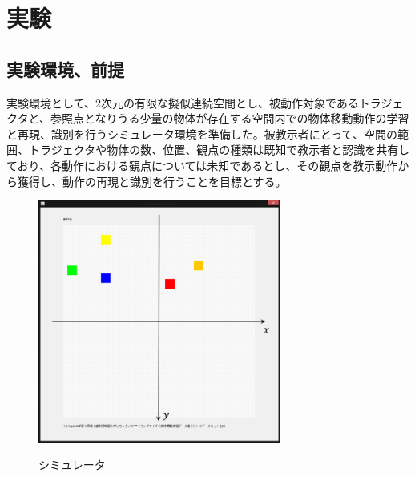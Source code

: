 ﻿%
\chapter{実験}

\section{実験環境、前提}

実験環境として、2次元の有限な擬似連続空間とし、被動作対象であるトラジェクタと、参照点となりうる少量の物体が存在する空間内での物体移動動作の学習と再現、識別を行うシミュレータ環境を準備した。被教示者にとって、空間の範囲、トラジェクタや物体の数、位置、観点の種類は既知で教示者と認識を共有しており、各動作における観点については未知であるとし、その観点を教示動作から獲得し、動作の再現と識別を行うことを目標とする。
	\begin{figure}[b]
		\begin{center}
			\includegraphics[width=8cm]{figure3.png} \\ %
			\caption{シミュレータ}
		\end{center}
	\end{figure}


